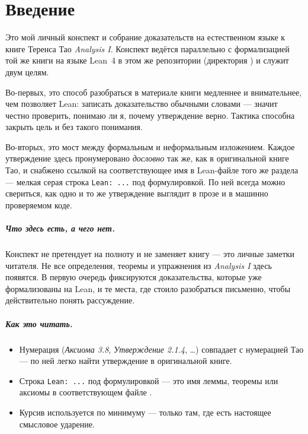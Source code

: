 \chapter*{Введение}

Это мой личный конспект и собрание доказательств на естественном языке к книге Теренса Тао
\emph{Analysis I}. Конспект ведётся параллельно с формализацией той же книги на языке Lean~4
в этом же репозитории (директория ) и служит двум целям.

Во-первых, это способ разобраться в материале книги медленнее и внимательнее, чем позволяет
Lean: записать доказательство обычными словами — значит честно проверить, понимаю ли я, почему
утверждение верно. Тактика способна закрыть цель и без такого понимания.

Во-вторых, это мост между формальным и неформальным изложением. Каждое утверждение здесь
пронумеровано \emph{дословно} так же, как в оригинальной книге Тао, и снабжено ссылкой на
соответствующее имя в Lean-файле того же раздела — мелкая серая строка \texttt{Lean:~...} под
формулировкой. По ней всегда можно свериться, как одно и то же утверждение выглядит в прозе и
в машинно проверяемом коде.

\paragraph{Что здесь есть, а чего нет.}
Конспект не претендует на полноту и не заменяет книгу — это личные заметки читателя.
Не все определения, теоремы и упражнения из \emph{Analysis I} здесь появятся. В первую очередь
фиксируются доказательства, которые уже формализованы на Lean, и те места, где стоило
разобраться письменно, чтобы действительно понять рассуждение.

\paragraph{Как это читать.}
\begin{itemize}
  \item Нумерация (\emph{Аксиома 3.8}, \emph{Утверждение 2.1.4}, \dots) совпадает с
        нумерацией Тао — по ней легко найти утверждение в оригинальной книге.
  \item Строка \texttt{Lean:~...} под формулировкой — это имя леммы, теоремы или аксиомы в
        соответствующем файле .
  \item Курсив используется по минимуму — только там, где есть настоящее смысловое ударение.
\end{itemize}
